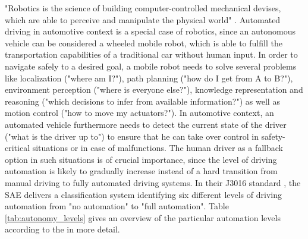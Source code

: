 "Robotics is the science of building computer-controlled mechanical devises, which are able to perceive and manipulate the physical world" \parencite{Thrun2005}.
Automated driving in automotive context is a special case of robotics, since an autonomous vehicle can be considered a wheeled mobile robot, which is able to fulfill the transportation capabilities of a traditional car without human input.
In order to navigate safely to a desired goal, a mobile robot needs to solve several problems like localization ("where am I?"), path planning ("how do I get from A to B?"), environment perception ("where is everyone else?"), knowledge representation and reasoning ("which decisions to infer from available information?") as well as motion control ("how to move my actuators?").
In automotive context, an automated vehicle furthermore needs to detect the current state of the driver ("what is the driver up to") to ensure that he can take over control in safety-critical situations or in case of malfunctions.
The human driver as a fallback option in such situations is of crucial importance, since the level of driving automation is likely to gradually increase instead of a hard transition from manual driving to fully automated driving systems.
In their J3016 standard , the \ac{SAE} delivers a classification system identifying six different levels of driving automation from "no automation" to "full automation".
Table \ref{tab:autonomy_levels} gives an overview of the particular automation levels according to the \textcite{SAE_J3016} in more detail.

